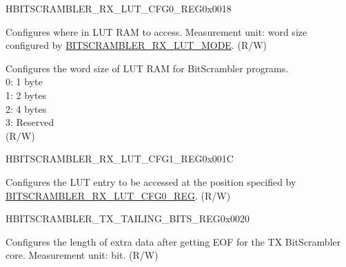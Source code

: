 \begin{register}{H}{BITSCRAMBLER\_RX\_LUT\_CFG0\_REG}{0x0018}\label{regdesc:BITSCRAMBLERRXLUTCFG0REG}
%
%
%
\regnewline%
\begin{regdesc}\begin{reglist}
\label{fielddesc:BITSCRAMBLERRXLUTIDX}\item [BITSCRAMBLER\_RX\_LUT\_IDX] Configures where in LUT RAM to access. Measurement unit: word size configured by \hyperref[fielddesc:BITSCRAMBLERRXLUTMODE]{BITSCRAMBLER\_RX\_LUT\_MODE}. (R/W)
\label{fielddesc:BITSCRAMBLERRXLUTMODE}\item [BITSCRAMBLER\_RX\_LUT\_MODE] Configures the word size of LUT RAM for BitScrambler programs. \\
0: 1 byte\\
1: 2 bytes\\
2: 4 bytes\\
3: Reserved\\
(R/W)
\end{reglist}\end{regdesc}
\end{register}


\begin{register}{H}{BITSCRAMBLER\_RX\_LUT\_CFG1\_REG}{0x001C}\label{regdesc:BITSCRAMBLERRXLUTCFG1REG}
%
\regnewline%
\begin{regdesc}\begin{reglist}
\label{fielddesc:BITSCRAMBLERRXLUT}\item [BITSCRAMBLER\_RX\_LUT] Configures the LUT entry to be accessed at the position specified by  \hyperref[regdesc:BITSCRAMBLERRXLUTCFG0REG]{BITSCRAMBLER\_RX\_LUT\_CFG0\_REG}. (R/W)
\end{reglist}\end{regdesc}
\end{register}


\begin{register}{H}{BITSCRAMBLER\_TX\_TAILING\_BITS\_REG}{0x0020}\label{regdesc:BITSCRAMBLERTXTAILINGBITSREG}
%
%
\regnewline%
\begin{regdesc}\begin{reglist}
\label{fielddesc:BITSCRAMBLERTXTAILINGBITS}\item [BITSCRAMBLER\_TX\_TAILING\_BITS] Configures the length of extra data after getting EOF for the TX BitScrambler core. Measurement unit: bit. (R/W)
\end{reglist}\end{regdesc}
\end{register}


